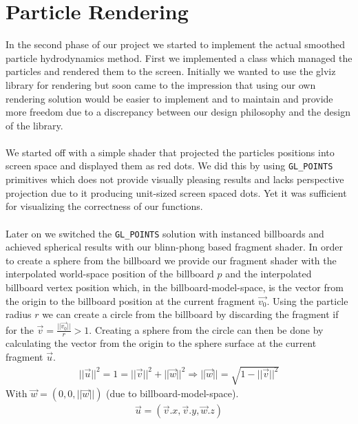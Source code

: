 \documentclass{ACGSeminar}
\begin{document}
\section{Particle Rendering}
In the second phase of our project we started to implement the actual smoothed particle hydrodynamics method. First we implemented a class which managed the particles and rendered them to the screen. Initially we wanted to use the glviz library for rendering but soon came to the impression that using our own rendering solution would be easier to implement and to maintain and provide more freedom due to a discrepancy between our design philosophy and the design of the library. \\
\\
We started off with a simple shader that projected the particles positions into screen space and displayed them as red dots. We did this by using \verb|GL_POINTS| primitives which does not provide visually pleasing results and lacks perspective projection due to it producing unit-sized screen spaced dots. Yet it was sufficient for visualizing the correctness of our functions. \\
\\
Later on we switched the \verb|GL_POINTS| solution with instanced billboards and achieved spherical results with our blinn-phong based fragment shader. In order to create a sphere from the billboard we provide our fragment shader with the interpolated world-space position of the billboard \(p\) and the interpolated billboard vertex position which, in the billboard-model-space, is the vector from the origin to the billboard position at the current fragment \(\vec{v_0}\). Using the particle radius \(r\) we can create a circle from the billboard by discarding the fragment if for the  \(\vec{v} = \frac{||\vec{v_0}||}{r} > 1\). Creating a sphere from the circle can then be done by calculating the vector from the origin to the sphere surface at the current fragment \(\vec{u}\).
\begin{equation} 
\begin{aligned}
||\vec{u}||^2 = 1 = ||\vec{v}||^2 + ||\vec{w}||^2 \Rightarrow ||\vec{w}|| = \sqrt{1 - ||\vec{v}||^2}
\end{aligned}
\end{equation}
With \(\vec{w} = (0,0,||\vec{w}||)\) (due to billboard-model-space).
\begin{equation}
\begin{aligned}
\vec{u} = (\vec{v}.x, \vec{v}.y, \vec{w}.z)
\end{aligned}
\end{equation}
\end{document}
